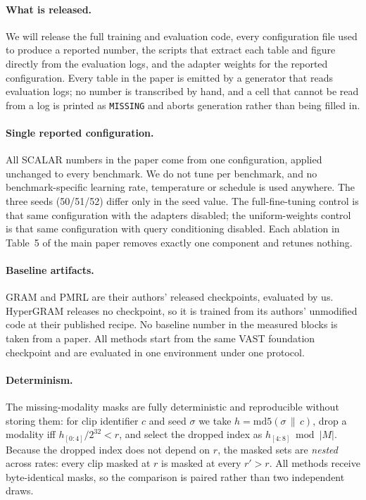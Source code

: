 \documentclass[10pt,twocolumn,letterpaper]{article}
\newcommand{\ours}{SCALAR}
\begin{document}
\paragraph{What is released.}
We will release the full training and evaluation code, every configuration file
used to produce a reported number, the scripts that extract each table and
figure directly from the evaluation logs, and the adapter weights for the
reported configuration. Every table in the paper is emitted by a generator that
reads evaluation logs; no number is transcribed by hand, and a cell that cannot
be read from a log is printed as \texttt{MISSING} and aborts generation rather
than being filled in.

\paragraph{Single reported configuration.}
All \ours{} numbers in the paper come from one configuration, applied unchanged
to every benchmark. We do not tune per benchmark, and no benchmark-specific
learning rate, temperature or schedule is used anywhere. The three seeds
(50/51/52) differ only in the seed value. The full-fine-tuning control is that
same configuration with the adapters disabled; the uniform-weights control is
that same configuration with query conditioning disabled. Each ablation in
Table~5 of the main paper removes exactly one component and retunes nothing.

\paragraph{Baseline artifacts.}
GRAM and PMRL are their authors' released checkpoints, evaluated by us.
HyperGRAM releases no checkpoint, so it is trained from its authors' unmodified
code at their published recipe. No baseline number in the measured blocks is
taken from a paper. All methods start from the same VAST foundation checkpoint
and are evaluated in one environment under one protocol.

\paragraph{Determinism.}
The missing-modality masks are fully deterministic and reproducible without
storing them: for clip identifier $c$ and seed $\sigma$ we take
$h = \mathrm{md5}(\sigma \,\|\, c)$, drop a modality iff
$h_{[0:4]}/2^{32} < r$, and select the dropped index as
$h_{[4:8]} \bmod |M|$. Because the dropped index does not depend on $r$, the
masked sets are \emph{nested} across rates: every clip masked at $r$ is masked
at every $r' > r$. All methods receive byte-identical masks, so the comparison
is paired rather than two independent draws.
\end{document}
